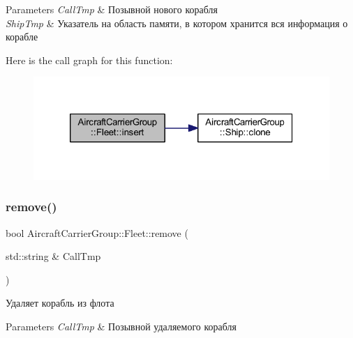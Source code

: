 \begin{DoxyParams}{Parameters}
{\em Call\+Tmp} & Позывной нового корабля \\
\hline
{\em Ship\+Tmp} & Указатель на область памяти, в котором хранится вся информация о корабле \\
\hline
\end{DoxyParams}
Here is the call graph for this function\+:
\nopagebreak
\begin{figure}[H]
\begin{center}
\leavevmode
\includegraphics[width=320pt]{class_aircraft_carrier_group_1_1_fleet_ac2f313e4be33de186169699fe37163ab_cgraph}
\end{center}
\end{figure}
\mbox{\label{class_aircraft_carrier_group_1_1_fleet_a7fa09607af647d0fb7edce10b90d28a3}} 
\subsubsection{\texorpdfstring{remove()}{remove()}}
{\footnotesize\ttfamily bool Aircraft\+Carrier\+Group\+::\+Fleet\+::remove (\begin{DoxyParamCaption}\item[{std\+::string \&}]{Call\+Tmp }\end{DoxyParamCaption})}



Удаляет корабль из флота 


\begin{DoxyParams}{Parameters}
{\em Call\+Tmp} & Позывной удаляемого корабля \\
\hline
\end{DoxyParams}
\mbox{\label{class_aircraft_carrier_group_1_1_fleet_afdc755fad8b201aa497161a5ef63a97c}} 
